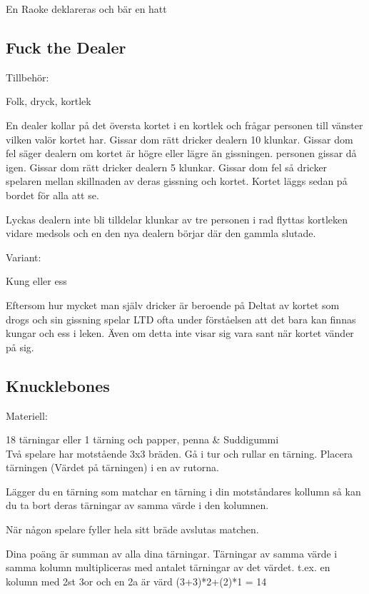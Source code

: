 En Raoke deklareras och bär en hatt

\newpage

\subsection*{\textbf{Fuck the Dealer}}

Tillbehör:

Folk, dryck, kortlek

En dealer kollar på det översta kortet i en kortlek och frågar personen till vänster vilken valör kortet har. Gissar dom rätt dricker dealern 10 klunkar. Gissar dom fel säger dealern om kortet är högre eller lägre än gissningen. personen gissar då igen. Gissar dom rätt dricker dealern 5 klunkar. Gissar dom fel så dricker spelaren mellan skillnaden av deras gissning och kortet. Kortet läggs sedan på bordet för alla att se.

Lyckas dealern inte bli tilldelar klunkar av tre personen i rad flyttas kortleken vidare medsols och en den nya dealern börjar där den gammla slutade.

Variant:

Kung eller ess

Eftersom hur mycket man själv dricker är beroende på Deltat av kortet som drogs och sin gissning spelar LTD ofta under förståelsen att det bara kan finnas kungar och ess i leken. Även om detta inte visar sig vara sant när kortet vänder på sig.

\subsection*{\textbf{Knucklebones}}

Materiell:

18 tärningar eller 1 tärning och papper, penna \& Suddigummi\\

Två spelare har motstående 3x3 bräden. Gå i tur och rullar en tärning. Placera tärningen (Värdet på tärningen) i en av rutorna.

Lägger du en tärning som matchar en tärning i din motståndares kollumn så kan du ta bort deras tärningar av samma värde i den kolumnen.

När någon spelare fyller hela sitt bräde avslutas matchen.

Dina poäng är summan av alla dina tärningar. Tärningar av samma värde i samma kolumn multipliceras med antalet tärningar av det värdet. t.ex. en kolumn med 2st 3or och en 2a är värd (3+3)*2+(2)*1 = 14

\newpage